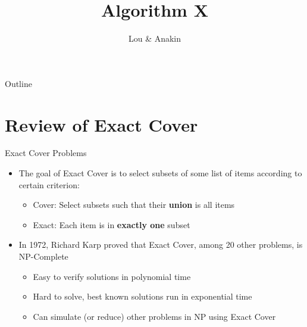 \documentclass[aspectratio=169]{beamer}
\title{Algorithm X}
\subtitle{\cite[Chapter~7.2.2.1]{TAOCP4B}}
\author{Lou \& Anakin}
\begin{document}

\begin{frame}
\titlepage
\end{frame}

\date{}

\begin{frame}{Outline}
  \tableofcontents
\end{frame}


\section{Review of Exact Cover}
\frame{\sectionpage}
\begin{frame}{Exact Cover Problems}
\begin{itemize}
    \item The goal of Exact Cover is to select subsets of some list of items according to certain criterion: \pause
    \begin{itemize}
        \item \textcolor{sigma@mainblue}{Cover:} Select subsets such that their \textbf{union} is all items
        \item \textcolor{sigma@mainblue}{Exact:} Each item is in \textbf{exactly one} subset
    \end{itemize} \pause
    \item In 1972, Richard Karp proved that Exact Cover, among 20 other problems, is \textcolor{sigma@mainblue}{NP-Complete}
        \begin{itemize}
            \item Easy to verify solutions in polynomial time
            \item Hard to solve, best known solutions run in exponential time 
            \item Can simulate (or reduce) other problems in NP using Exact Cover
        \end{itemize}
\end{itemize}
\end{frame}
\end{document}
